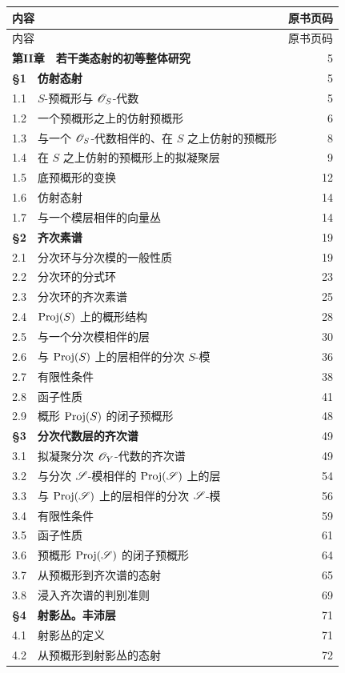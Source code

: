 \begin{longtable}{@{}p{}@{\hspace{1em}}r@{}}
\toprule 内容 & 原书页码\\\midrule\endfirsthead
\toprule 内容 & 原书页码\\\midrule\endhead\bottomrule\endfoot
\textbf{第II章　若干类态射的初等整体研究} &5\\
\textbf{§1　仿射态射}&5\\
1.1　$S$-预概形与 $\mathscr O_S$-代数&5\\
1.2　一个预概形之上的仿射预概形&6\\
1.3　与一个 $\mathscr O_S$-代数相伴的、在 $S$ 之上仿射的预概形&8\\
1.4　在 $S$ 之上仿射的预概形上的拟凝聚层&9\\
1.5　底预概形的变换&12\\
1.6　仿射态射&14\\
1.7　与一个模层相伴的向量丛&14\\
\textbf{§2　齐次素谱}&19\\
2.1　分次环与分次模的一般性质&19\\
2.2　分次环的分式环&23\\
2.3　分次环的齐次素谱&25\\
2.4　$\operatorname{Proj}(S)$ 上的概形结构&28\\
2.5　与一个分次模相伴的层&30\\
2.6　与 $\operatorname{Proj}(S)$ 上的层相伴的分次 $S$-模&36\\
2.7　有限性条件&38\\
2.8　函子性质&41\\
2.9　概形 $\operatorname{Proj}(S)$ 的闭子预概形&48\\
\textbf{§3　分次代数层的齐次谱}&49\\
3.1　拟凝聚分次 $\mathscr O_Y$-代数的齐次谱&49\\
3.2　与分次 $\mathscr S$-模相伴的 $\operatorname{Proj}(\mathscr S)$ 上的层&54\\
3.3　与 $\operatorname{Proj}(\mathscr S)$ 上的层相伴的分次 $\mathscr S$-模&56\\
3.4　有限性条件&59\\
3.5　函子性质&61\\
3.6　预概形 $\operatorname{Proj}(\mathscr S)$ 的闭子预概形&64\\
3.7　从预概形到齐次谱的态射&65\\
3.8　浸入齐次谱的判别准则&69\\
\textbf{§4　射影丛。丰沛层}&71\\
4.1　射影丛的定义&71\\
4.2　从预概形到射影丛的态射&72\\

\end{longtable}
